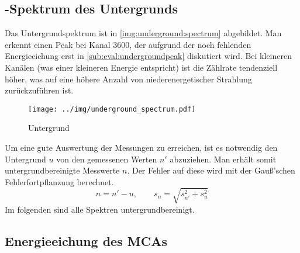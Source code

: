 \subsection{\textgamma-Spektrum des Untergrunds}
Das Untergrundspektrum ist in \autoref{img:underground:spectrum} abgebildet. Man erkennt einen Peak bei Kanal 3600, der aufgrund der noch 
fehlenden Energieeichung erst in \ref{sub:eval:undergroundpeak} diskutiert wird. Bei kleineren Kanälen (was einer kleineren Energie entspricht) ist 
die Zählrate tendenziell höher, was auf eine höhere Anzahl von niederenergetischer Strahlung zurückzuführen ist. 
\begin{figure}[H]
\begin{center}
  \texttt{[image: ../img/underground\_spectrum.pdf]}
  \caption{Untergrund}
  \label{img:underground:spectrum}
\end{center}
\end{figure}
Um eine gute Auswertung der Messungen zu erreichen, ist es notwendig den Untergrund $u$ von den gemessenen Werten $n'$ abzuziehen. Man erhält 
somit untergrundbereinigte Messwerte $n$. Der Fehler auf diese wird mit der Gauß'schen Fehlerfortpflanzung berechnet.
\begin{equation}
  n = n' - u, \qquad s_n = \sqrt{s_{n'}^2 + s_u^2}
\end{equation}
Im folgenden sind alle Spektren untergrundbereinigt.

\subsection{Energieeichung des MCAs}

